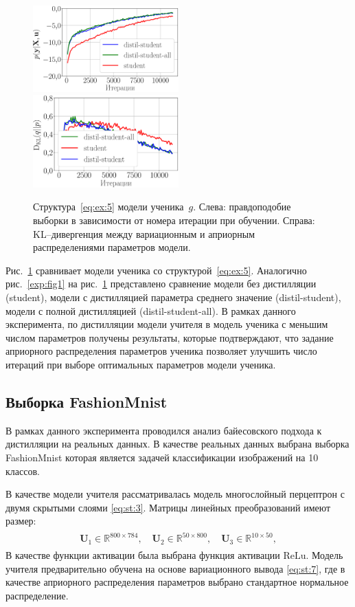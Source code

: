 \documentclass[12pt]{a&t}
\begin{document}
\begin{figure}[h!]
\includegraphics[width=0.5\textwidth]{synthetic_likelihood_2_layers.eps}
\includegraphics[width=0.5\textwidth]{synthetic_D_KL_2_layers.eps}
\caption{Структура~\eqref{eq:ex:5} модели ученика~$g$. Слева: правдоподобие выборки в зависимости от номера итерации при обучении. Справа: KL--дивергенция между вариационным и априорным распределениями параметров модели.}
\label{exp:fig2}
\end{figure}

Рис.~\ref{exp:fig2} сравнивает модели ученика со структурой~\eqref{eq:ex:5}. Аналогично рис.~\ref{exp:fig1} на рис.~\ref{exp:fig2} представлено сравнение модели без дистилляции (student), модели с дистилляцией параметра среднего значение (distil-student), модели с полной дистилляцией (distil-student-all). В рамках данного эксперимента, по дистилляции модели учителя в модель ученика с меньшим числом параметров получены результаты, которые подтверждают, что задание априорного распределения параметров ученика позволяет улучшить число итераций при выборе оптимальных параметров модели ученика.

\subsection{Выборка FashionMnist}

В рамках данного эксперимента проводился анализ байесовского подхода к дистилляции на реальных данных.  В качестве реальных данных выбрана выборка FashionMnist\cite{fashionmnist} которая является задачей классификации изображений на 10 классов.

В качестве модели учителя рассматривалась модель многослойный перцептрон с двумя скрытыми слоями \eqref{eq:st:3}. Матрицы линейных преобразований имеют размер:
\begin{gather}
\label{eq:ex:7}
\begin{aligned}
\mathbf{U}_{1} \in \mathbb{R}^{800 \times 784}, \quad \mathbf{U}_{2} \in \mathbb{R}^{50 \times 800}, \quad \mathbf{U}_{3} \in \mathbb{R}^{10 \times 50},
\end{aligned}
\end{gather}
В качестве функции активации была выбрана функция активации $\text{ReLu}$.
Модель учителя предварительно обучена на основе вариационного вывода \eqref{eq:st:7}, где в качестве априорного распределения параметров выбрано стандартное нормальное распределение.
\end{document}
